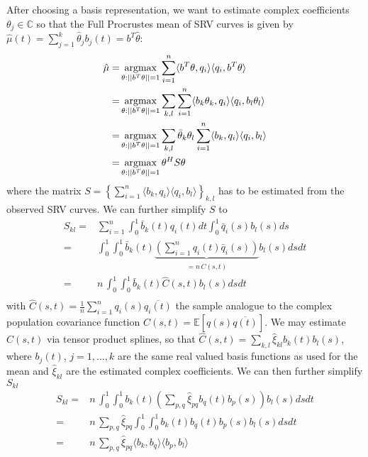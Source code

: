 {After choosing a basis representation,  we want to estimate complex coefficients $\theta_j \in \mathbb{C}$ so that the Full Procrustes mean of SRV curves is given by $\hat{\mu}(t) = \sum_{j=1}^k \hat{\theta}_j b_j(t) = b^T \hat{\theta}$:
\begin{align*}
    \hat{\mu} =& \operatorname*{argmax}_{\theta : ||b^T\theta||=1} \sum_{i=1}^n \langle b^T\theta, q_i \rangle \langle q_i, b^T\theta \rangle \\
    =& \operatorname*{argmax}_{\theta : ||b^T\theta||=1} \sum_{k,l} \sum_{i=1}^n \langle b_k \theta_k, q_i \rangle \langle q_i, b_l \theta_l \rangle \\
    =& \operatorname*{argmax}_{\theta : ||b^T\theta||=1} \sum_{k,l} \bar{\theta}_k \theta_l \sum_{i=1}^n \langle b_k, q_i \rangle \langle q_i, b_l \rangle \\
    =& \operatorname*{argmax}_{\theta : ||b^T\theta||=1} \theta^H S \theta \\
\end{align*}
where the matrix $S = \left\{ \sum_{i=1}^n \langle b_k, q_i \rangle \langle q_i, b_l \rangle \right\}_{k,l}$ has to be estimated from the observed SRV curves.
We can further simplify $S$ to
\begin{align*}
    S_{kl} =& \sum_{i=1}^n \int_0^1 \bar{b}_k(t) q_i(t) dt \int_0^1 \bar{q}_i(s) b_l(s) ds \\
    =& \int_0^1 \int_0^1 \bar{b}_k(t) \underbrace{\left( \sum_{i=1}^n q_i(t) \bar{q}_i(s) \right)}_{= n \, \hat{C}(s,t)} b_l(s) ds dt\\
    =& n \, \int_0^1 \int_0^1 \bar{b}_k(t) \hat{C}(s,t) b_l(s) ds dt\\
\end{align*}
with $\hat{C}(s,t) = \frac{1}{n} \sum_{i=1}^n q_i(s) \overline{q_i(t)}$ the sample analogue to the complex population covariance function $C(s,t) = \mathbb{E}[q(s)\overline{q(t)}]$.
We may estimate $C(s,t)$ via tensor product splines, so that $\hat{C}(s,t) = \sum_{k,l} \hat{\xi}_{kl} b_k(t) b_l(s)$, where $b_j(t)$, $j=1,\dots,k$ are the same real valued basis functions as used for the mean and $\hat{\xi}_{kl}$ are the estimated complex coefficients.
We can then further simplify $S_{kl}$
\begin{align*}
    S_{kl} =& n \, \int_0^1 \int_0^1 b_k(t) \left( \sum_{p,q} \hat{\xi}_{pq} b_q(t) b_p(s) \right) b_l(s) ds dt\\
    =& n \, \sum_{p,q} \hat{\xi}_{pq} \int_0^1 \int_0^1 b_k(t) b_q(t) b_p(s) b_l(s) ds dt\\
    =& n \, \sum_{p,q} \hat{\xi}_{pq} \langle b_k, b_q \rangle \langle b_p, b_l \rangle\\

\end{align*}}
